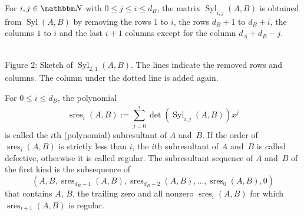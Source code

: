 \documentclass[3p,11pt,preprint]{elsarticle}
\let\set\mathbbm
\newcommand{\D}{x}
\newcommand{\lc}{\operatorname{lc}}
\newcommand{\syl}{\operatorname{Syl}}
\newcommand{\pres}{\operatorname{sres}}
\newcommand{\cc}{\operatorname{tc}}
\begin{document}
For $i,j\in\set N$ with $0\leq j\leq i \leq d_B$, the matrix $\syl_{i,j}(A,B)$ is obtained from $\syl(A,B)$ by removing the rows $1$ to $i$, the rows $d_B+1$ to $d_B+i$, the columns $1$ to $i$ and the last $i+1$ columns except for the column $d_A+d_B-j$. 
\begin{center}
\\
\vspace{0.1cm}\scriptsize{Figure 2: Sketch of $\syl_{2,1}(A,B)$. The lines indicate the removed rows and columns. The column under the dotted line is added again.}
\end{center}
\begin{definition}
 For $0\leq i\leq d_B$, the polynomial \[\pres_i(A,B) := \sum_{j=0}^{i}{\det(\syl_{i,j}(A,B))\D^j}\] is called the $i$th (polynomial) subresultant of $A$ and~$B$.
 If the order of $\pres_i(A,B)$ is strictly less than $i$, the $i$th subresultant of $A$ and~$B$ is called defective, otherwise it is called regular.
 The subresultant sequence of $A$ and~$B$ of the first kind is the subsequence of \[(A,B,\pres_{d_B-1}(A,B),\pres_{d_B-2}(A,B),\dots,\pres_{0}(A,B),0)\] that contains $A$, $B$, the trailing zero and all nonzero $\pres_{i}(A,B)$ for which $\pres_{i+1}(A,B)$ is regular.
\end{definition}
\end{document}
